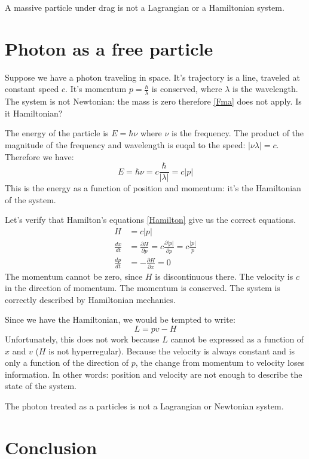\documentclass[11pt]{article}
\begin{document}
A massive particle under drag is not a Lagrangian or a Hamiltonian system.

\section{Photon as a free particle}

Suppose we have a photon traveling in space. It's trajectory is a line, traveled at constant speed $c$. It's momentum $p=\frac{\hbar}{\lambda}$ is conserved, where $\lambda$ is the wavelength. The system is not Newtonian: the mass is zero therefore \eqref{Fma} does not apply. Is it Hamiltonian?

The energy of the particle is $E=\hbar \nu$ where $\nu$ is the frequency. The product of the magnitude of the frequency and wavelength is euqal to the speed: $|\nu \lambda| = c$. Therefore we have:
\begin{equation*}
E=\hbar \nu = c \frac{\hbar}{|\lambda|} = c|p| \end{equation*}
This is the energy as a function of position and momentum: it's the Hamiltonian of the system.

Let's verify that Hamilton's equations \eqref{Hamilton} give us the correct equations.
\begin{align*}
H &= c|p| \\
\frac{dx}{dt} &= \frac{\partial H}{\partial p} = c \frac{\partial |p|}{\partial p} = c \frac{|p|}{p} \\
\frac{dp}{dt} &= - \frac{\partial H}{\partial x} = 0
\end{align*}
The momentum cannot be zero, since $H$ is discontinuous there. The velocity is $c$ in the direction of momentum. The momentum is conserved. The system is correctly described by Hamiltonian mechanics.

Since we have the Hamiltonian, we would be tempted to write:
\begin{equation}
\label{Legendre}
L = pv - H
\end{equation}
Unfortunately, this does not work because $L$ cannot be expressed as a function of $x$ and $v$ ($H$ is not hyperregular). Because the velocity is always constant and is only a function of the direction of $p$, the change from momentum to velocity loses information. In other words: position and velocity are not enough to describe the state of the system.

The photon treated as a particles is not a Lagrangian or Newtonian system.

\section{Conclusion}
\end{document}
